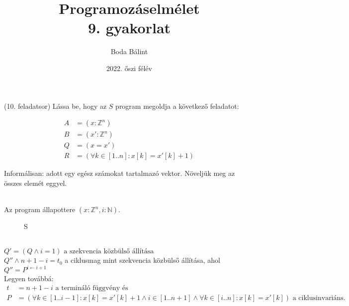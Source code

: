 \documentclass[a4paper,12pt]{article}
\title{\huge{Programozáselmélet} \\[-4pt] \large 9. gyakorlat \vspace{-15pt}}
\author{Boda Bálint}
\date{\vspace{-12pt}2022. őszi félév}
\begin{document}
    \maketitle
    \setcounter{question}{2}
\begin{question}(10. feladatsor)
	Lássa be, hogy az $S$ program megoldja a következő feladatot:
	\\[-16pt]
	\begin{minipage}{0.6\textwidth}
		\vspace*{0pt}
		\begin{align*}
			A &= \left( x: \mathbb{Z}^n \right) \\
			B &= \left( x': \mathbb{Z}^n \right) \\
			Q &= (x = x') \\
			R &= (\forall k \in [1..n]: x[k] = x'[k] +1)
		\end{align*}
	\end{minipage}
	\begin{minipage}{0.39\textwidth}
		Informálisan: adott egy egész számokat tartalmazó vektor. Növeljük meg az összes elemét eggyel.
		\vspace*{0pt}
	\end{minipage}
	\\[8pt]
	Az program állapottere $ \left( x: \mathbb{Z}^n, i: \mathbb{N}\right) $.

	\begin{wrapfigure}[3]{l}{3.5cm}
			\vspace{-2\baselineskip}
		\begin{stuki*}[3.5cm]{S}
			\begin{WHILE}{2}{}
			\end{WHILE}
		\end{stuki*}
	\end{wrapfigure}\leavevmode
	\noindent
	\\[18pt]
	$Q' = \left( Q \land i=1 \right) \text{ a szekvencia közbülső állítása}$
	\\[22pt]
	$Q'' \land n + 1 - i = t_0 $ a ciklusmag mint szekvencia közbülső állítása, ahol $Q'' = P^{i\leftarrow i+1} $
	\\[16pt]
	\noindent
	Legyen továbbá:
	\vspace{-10pt}
	\begin{align*}
		t &= n + 1 - i \text{ a termináló függvény és} \\
		P &= \left( \forall k \in [1..i-1]: x[k] = x'[k] + 1 \land i \in [1..n+1] \land \forall k \in [i..n]: x[k] = x'[k] \right) \text{ a ciklusinvariáns.}
	\end{align*}
	\end{question}
\end{document}
